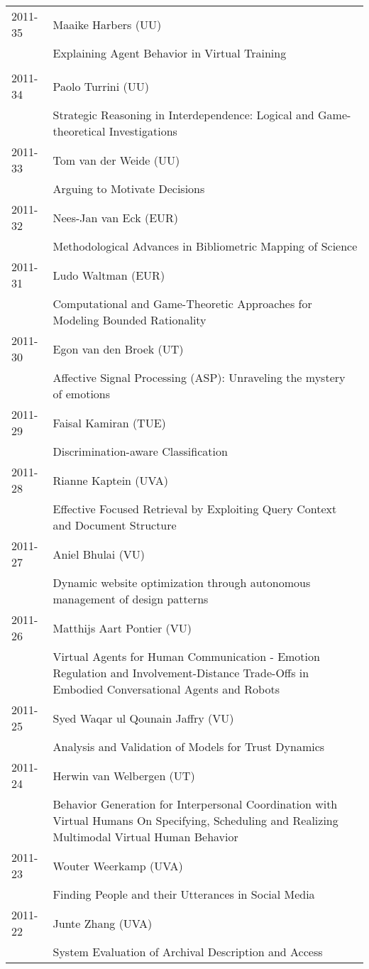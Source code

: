 \begin{longtable}{p{1.25cm}p{10.75cm}}
2011-35 & Maaike Harbers (UU) \\& Explaining Agent Behavior in Virtual Training \\
\\
2011-34 & Paolo Turrini (UU) \\& Strategic Reasoning in Interdependence: Logical and Game-theoretical Investigations \\
2011-33 & Tom van der Weide (UU) \\& Arguing to Motivate Decisions \\
2011-32 & Nees-Jan van Eck (EUR) \\& Methodological Advances in Bibliometric Mapping of Science \\
2011-31 & Ludo Waltman (EUR) \\& Computational and Game-Theoretic Approaches for Modeling Bounded Rationality \\
2011-30 & Egon van den Broek (UT) \\& Affective Signal Processing (ASP): Unraveling the mystery of emotions \\
2011-29 & Faisal Kamiran (TUE) \\& Discrimination-aware Classification \\
2011-28 & Rianne Kaptein (UVA) \\& Effective Focused Retrieval by Exploiting Query Context and Document Structure \\
2011-27 & Aniel Bhulai (VU) \\& Dynamic website optimization through autonomous management of design patterns \\
2011-26 & Matthijs Aart Pontier (VU) \\& Virtual Agents for Human Communication - Emotion Regulation and Involvement-Distance Trade-Offs in Embodied Conversational Agents and Robots \\
2011-25 & Syed Waqar ul Qounain Jaffry (VU) \\& Analysis and Validation of Models for Trust Dynamics \\
2011-24 & Herwin van Welbergen (UT) \\& Behavior Generation for Interpersonal Coordination with Virtual Humans On Specifying, Scheduling and Realizing Multimodal Virtual Human Behavior \\
2011-23 & Wouter Weerkamp (UVA) \\& Finding People and their Utterances in Social Media \\
2011-22 & Junte Zhang (UVA) \\& System Evaluation of Archival Description and Access \\

\end{longtable}

